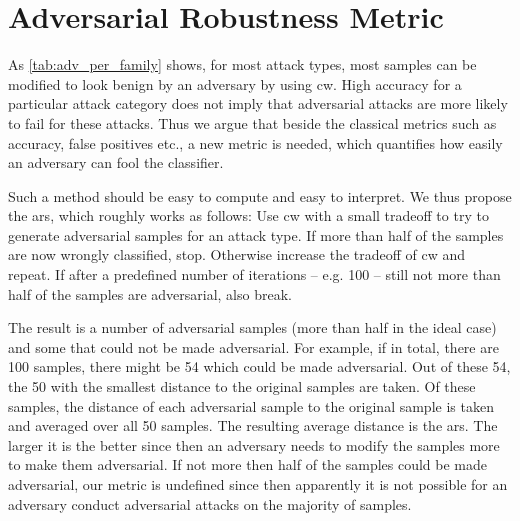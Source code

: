 \documentclass[conference]{IEEEtran}
\newcommand\note[2]{{\color{#1}#2}}
\newcommand\todo[1]{{\note{red}{TODO: #1}}}
\begin{document}

\section{Adversarial Robustness Metric}

As \autoref{tab:adv_per_family} shows, for most attack types, most samples can be modified to look benign by an adversary by using \gls{cw}. High accuracy for a particular attack category does not imply that adversarial attacks are more likely to fail for these attacks. Thus we argue that beside the classical metrics such as accuracy, false positives etc., a new metric is needed, which quantifies how easily an adversary can fool the classifier. 

Such a method should be easy to compute and easy to interpret. We thus propose the \gls{ars}, which roughly works as follows: Use \gls{cw} with a small tradeoff to try to generate adversarial samples for an attack type. If more than half of the samples are now wrongly classified, stop. Otherwise increase the tradeoff of \gls{cw} and repeat. If after a predefined number of iterations -- e.g. 100 -- still not more than half of the samples are adversarial, also break. 

The result is a number of adversarial samples (more than half in the ideal case) and some that could not be made adversarial. For example, if in total, there are 100 samples, there might be 54 which could be made adversarial. Out of these 54, the 50 with the smallest distance to the original samples are taken. Of these samples, the distance of each adversarial sample to the original sample is taken and averaged over all 50 samples. The resulting average distance is the \gls{ars}. The larger it is the better since then an adversary needs to modify the samples more to make them adversarial. If not more then half of the samples could be made adversarial, our metric is undefined since then apparently it is not possible for an adversary conduct adversarial attacks on the majority of samples.
\end{document}
